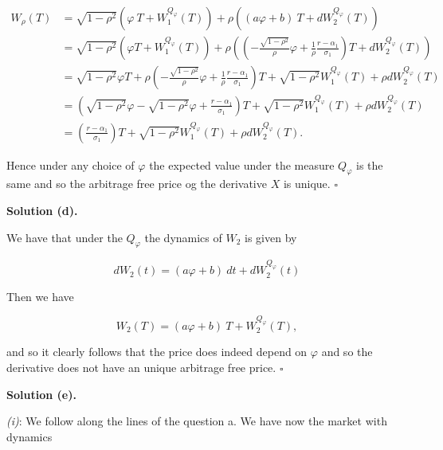 \documentclass[
]{book}
\begin{document}
\begin{align*}
W_\rho(T)&=\sqrt{1-\rho^2}\left(\varphi\ T+W^{Q_\varphi}_1(T)\right)+\rho\left((a\varphi+b)\ T+dW^{Q_\varphi}_2(T)\right)\\
&=\sqrt{1-\rho^2}\left(\varphi T+W^{Q_\varphi}_1(T)\right)+\rho\left(\left(-\frac{\sqrt{1-\rho^2}}{\rho}\varphi+\frac{1}{\rho}\frac{r-\alpha_1}{\sigma_1}\right)T+dW^{Q_\varphi}_2(T)\right)\\
&=\sqrt{1-\rho^2}\varphi T+\rho\left(-\frac{\sqrt{1-\rho^2}}{\rho}\varphi+\frac{1}{\rho}\frac{r-\alpha_1}{\sigma_1}\right)T+\sqrt{1-\rho^2}W^{Q_\varphi}_1(T)+\rho dW^{Q_\varphi}_2(T)\\
&=\left(\sqrt{1-\rho^2}\varphi-\sqrt{1-\rho^2}\varphi+\frac{r-\alpha_1}{\sigma_1}\right)T+\sqrt{1-\rho^2}W^{Q_\varphi}_1(T)+\rho dW^{Q_\varphi}_2(T)\\
&=\left(\frac{r-\alpha_1}{\sigma_1}\right)T+\sqrt{1-\rho^2}W^{Q_\varphi}_1(T)+\rho dW^{Q_\varphi}_2(T).
\end{align*}

Hence under any choice of \(\varphi\) the expected value under the measure \(Q_\varphi\) is the same and so the arbitrage free price og the derivative \(X\) is unique. \(\square\)

\noindent\makebox[\linewidth]{\rule{\textwidth}{0.4pt}}

\textbf{Solution (d).}

We have that under the \(Q_\varphi\) the dynamics of \(W_2\) is given by

\[
dW_2(t)=(a\varphi+b)\ dt+dW^{Q_\varphi}_2(t)
\]

Then we have

\[
W_2(T)=(a\varphi+b)\ T+W^{Q_\varphi}_2(T),
\]

and so it clearly follows that the price does indeed depend on \(\varphi\) and so the derivative does not have an unique arbitrage free price. \(\square\)

\noindent\makebox[\linewidth]{\rule{\textwidth}{0.4pt}}

\textbf{Solution (e).}

\emph{(i)}: We follow along the lines of the question a. We have now the market with dynamics
\end{document}

